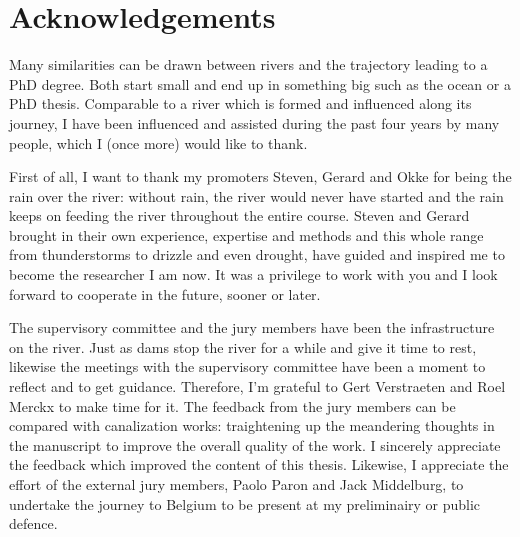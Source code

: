 \chapter*{Acknowledgements}                                  \label{ch:acknowledgements}


Many similarities can be drawn between rivers and the trajectory leading to a PhD degree. Both start small and end up in something big such as the ocean or a PhD thesis. Comparable to a river which is formed and influenced along its journey, I have been influenced and assisted during the past four years by many people, which I (once more) would like to thank.
\bigskip 

First of all, I want to thank my promoters Steven, Gerard and Okke for being the rain over the river: without rain, the river would never have started and the rain keeps on feeding the river throughout the entire course. Steven and Gerard brought in their own experience, expertise and methods and this whole range from thunderstorms to drizzle and even drought, have guided and inspired me to become the researcher I am now. It was a privilege to work with you and I look forward to cooperate in the future, sooner or later. 
\bigskip

The supervisory committee and the jury members have been the infrastructure on the river. Just as dams stop the river for a while and give it time to rest, likewise the meetings with the supervisory committee have been a moment to reflect and to get guidance. Therefore, I'm grateful to Gert Verstraeten and Roel Merckx to make time for it. The feedback from the jury members can be compared with canalization works: traightening up the meandering thoughts in the manuscript to improve the overall quality of the work. I sincerely appreciate the feedback which improved the content of this thesis. Likewise, I appreciate the effort of the external jury members, Paolo Paron and Jack Middelburg, to undertake the journey to Belgium to be present at my preliminairy or public defence.
\bigskip


